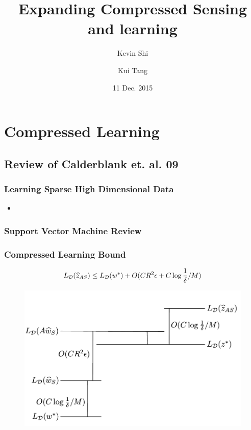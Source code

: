 \documentclass[aspectratio=34]{beamer}
\title{Expanding Compressed Sensing and learning}
\author{Kevin Shi \and Kui Tang}
\institute{Columbia University}
\date{11 Dec. 2015}
\begin{document}
\frame{\titlepage}


\section{Compressed Learning}

\subsection{Review of Calderblank et. al. 09}

\begin{frame}
    \frametitle{Learning Sparse High Dimensional Data}
    \begin{itemize}
        \item \citet{Calderbank09}
    \end{itemize}
\end{frame}

\begin{frame}
    \frametitle{Support Vector Machine Review}
\end{frame}

\begin{frame}
    \frametitle{Compressed Learning Bound}
    $$L_{\cal D}(\widehat{z}_{AS}) \leq L_{\cal D}(w^*) + O(CR^2\epsilon + C\log\frac{1}{\delta} / M)  $$
    \begin{figure}
        \includegraphics[width=\columnwidth]{bounds_argument_figure.pdf}
    \end{figure}
\end{frame}
\end{document}
